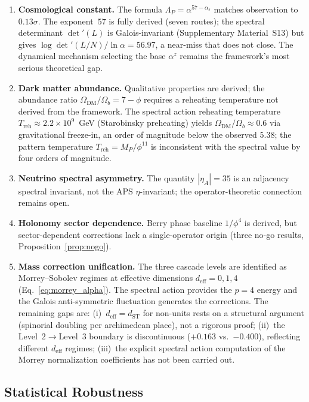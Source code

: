\documentclass[12pt,a4paper]{article}
\theoremstyle{definition}
\begin{document}
\begin{enumerate}
\item \textbf{Cosmological constant.} The formula $\Lambda_P = \alpha^{57-\alpha_s}$ matches observation to $0.13\sigma$.  The exponent~$57$ is fully derived (seven routes); the spectral determinant $\det'(L)$ is Galois-invariant (Supplementary Material~S13) but gives $\log\det'(L/N)/\ln\alpha = 56.97$, a near-miss that does not close.  The dynamical mechanism selecting the base $\alpha^z$ remains the framework's most serious theoretical gap.
\item \textbf{Dark matter abundance.} Qualitative properties are derived; the abundance ratio $\Omega_{\text{DM}}/\Omega_b = 7-\phi$ requires a reheating temperature not derived from the framework.  The spectral action reheating temperature $T_{\text{reh}} \approx 2.2 \times 10^9$~GeV (Starobinsky preheating) yields $\Omega_{\text{DM}}/\Omega_b \approx 0.6$ via gravitational freeze-in, an order of magnitude below the observed $5.38$; the pattern temperature $T_{\text{reh}} = M_P/\phi^{11}$ is inconsistent with the spectral value by four orders of magnitude.
\item \textbf{Neutrino spectral asymmetry.} The quantity $|\eta_A| = 35$ is an adjacency spectral invariant, not the APS $\eta$-invariant; the operator-theoretic connection remains open.
\item \textbf{Holonomy sector dependence.} Berry phase baseline $1/\phi^4$ is derived, but sector-dependent corrections lack a single-operator origin (three no-go results, Proposition~\ref{prop:nogo}).
\item \textbf{Mass correction unification.} The three cascade levels are identified as Morrey--Sobolev regimes at effective dimensions $d_{\text{eff}} = 0, 1, 4$ (Eq.~\ref{eq:morrey_alpha}).  The spectral action provides the $p = 4$ energy and the Galois anti-symmetric fluctuation generates the corrections.  The remaining gaps are: (i)~$d_{\text{eff}} = d_{\text{ST}}$ for non-units rests on a structural argument (spinorial doubling per archimedean place), not a rigorous proof; (ii)~the Level~2$\to$Level~3 boundary is discontinuous ($+0.163$ vs.\ $-0.400$), reflecting different $d_{\text{eff}}$ regimes; (iii)~the explicit spectral action computation of the Morrey normalization coefficients has not been carried out.
\end{enumerate}

\subsection{Statistical Robustness}
\label{sec:statistics}
\end{document}
